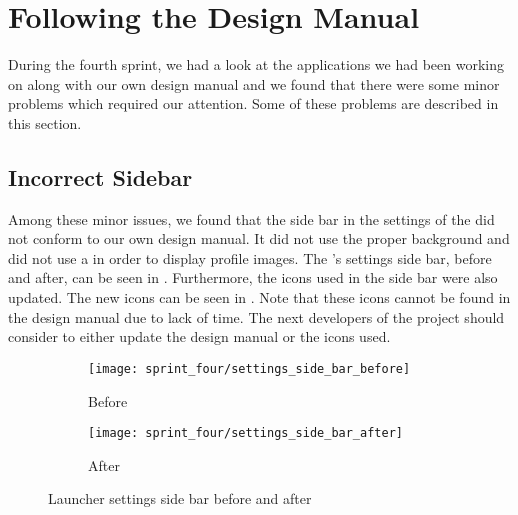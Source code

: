 
\section{Following the Design Manual}
\label{sec:following_design_guides}
During the fourth sprint, we had a look at the applications we had been working on along with our own design manual and we found that there were some minor problems which required our attention. Some of these problems are described in this section.

\subsection{Incorrect Sidebar}
\label{sec:wrong_sidebar}
Among these minor issues, we found that the side bar in the settings of the \launcher did not conform to our own design manual. It did not use the proper background and did not use a  in order to display profile images. The \launcher's settings side bar, before and after, can be seen in . Furthermore, the icons used in the side bar were also updated. The new icons can be seen in .  Note that these icons cannot be found in the design manual due to lack of time. The next developers of the project should consider to either update the design manual or the icons used.  

\begin{figure}[!htbp]
    \centering

    \begin{subfigure}[t]{0.3\textwidth}
        \texttt{[image: sprint\_four/settings\_side\_bar\_before]}
        \caption{Before}
        \label{fig:launcher_settings_side_bar_before}
    \end{subfigure}
    \hspace{5em} 
    \begin{subfigure}[t]{0.3\textwidth}
        \texttt{[image: sprint\_four/settings\_side\_bar\_after]}
        \caption{After}
        \label{fig:launcher_settings_side_bar_after}
    \end{subfigure}
    
    \caption{Launcher settings side bar before and after}
    \label{fig:launcher_settings_side_bar_before_and_after}
\end{figure}



